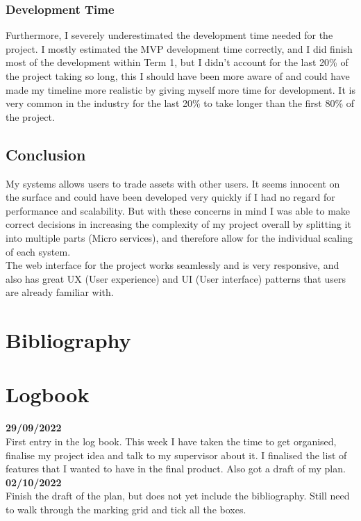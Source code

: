 \documentclass[titlepage]{article}
\begin{document}
\subsubsection{Development Time}
Furthermore, I severely underestimated the development time needed for the project. I mostly estimated the MVP development time correctly, and I did finish most of the development within Term 1, but I didn't account for the last 20\% of the project taking so long, this I should have been more aware of and could have made my timeline more realistic by giving myself more time for development. It is very common in the industry for the last 20\% to take longer than the first 80\% of the project.

\subsection{Conclusion}
My systems allows users to trade assets with other users. It seems innocent on the surface and could have been developed very quickly if I had no regard for performance and scalability. But with these concerns in mind I was able to make correct decisions in increasing the complexity of my project overall by splitting it into multiple parts (Micro services), and therefore allow for the individual scaling of each system. \\

The web interface for the project works seamlessly and is very responsive, and also has great UX (User experience) and UI (User interface) patterns that users are already familiar with.

\section{Bibliography}




\pagebreak
\section{Logbook}

\textbf{29/09/2022} \\
First entry in the log book. This week I have taken the time to get organised, finalise my project idea and talk to my supervisor about it. I finalised the list of features that I wanted to have in the final product. Also got a draft of my plan.
\\

\noindent
\textbf{02/10/2022} \\
Finish the draft of the plan, but does not yet include the bibliography. Still need to walk through the marking grid and tick all the boxes.
\end{document}
